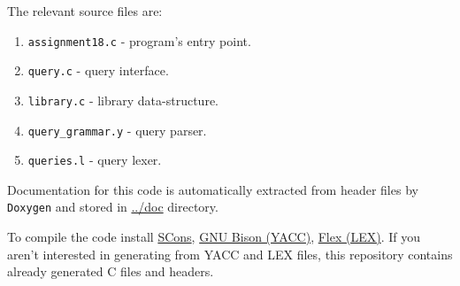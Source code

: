 \documentclass[11pt]{article}
\begin{document}
The relevant source files are:
\begin{enumerate}
\item \texttt{assignment18.c} - program's entry point.
\item \texttt{query.c} - query interface.
\item \texttt{library.c} - library data-structure.
\item \texttt{query\_grammar.y} - query parser.
\item \texttt{queries.l} - query lexer.
\end{enumerate}

Documentation for this code is automatically extracted from header files by
\texttt{Doxygen} and stored in \url{../doc} directory.

To compile the code install \href{http://scons.org/doc/0.98.4/HTML/scons-user/x166.html}{SCons}, \href{https://geeksww.com/tutorials/miscellaneous/bison_gnu_parser_generator/installation/installing_bison_gnu_parser_generator_ubuntu_linux.php}{GNU Bison (YACC)}, \href{http://flex.sourceforge.net/}{Flex (LEX)}.  If you
aren't interested in generating from YACC and LEX files, this repository
contains already generated C files and headers.
\end{document}
